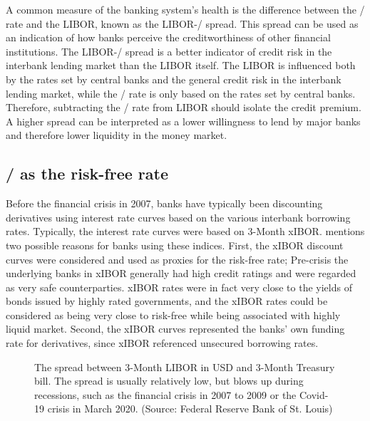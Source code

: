 \documentclass[main.tex]{subfiles}
\begin{document}
    A common measure of the banking system's health is the difference between the \OIS/ rate
    and the LIBOR, known as the LIBOR-\OIS/ spread.
    This spread can be used as an indication of how banks perceive the creditworthiness
    of other financial institutions. 
    The LIBOR-\OIS/ spread is a better indicator of credit risk in the interbank lending market
    than the LIBOR itself. 
    The LIBOR is influenced both by the rates set by central banks and 
    the general credit risk in the interbank lending market,
    while the \OIS/ rate is only based on the rates set by central banks.
    Therefore, subtracting the \OIS/ rate from LIBOR should isolate the credit premium.
    A higher spread can be interpreted as a lower willingness to lend by major banks
    and therefore lower liquidity in the money market.

    \subsection{\OIS/ as the risk-free rate}
    
    Before the financial crisis in 2007, banks have typically been discounting
    derivatives using interest rate curves based on the various interbank borrowing rates.
    Typically, the interest rate curves were based on 3-Month xIBOR.
    \textcite[Section 8.6]{Green2015XVA} 
    mentions two possible reasons for banks using these indices.
    First, the xIBOR discount curves were considered and used as proxies for the risk-free rate;
    Pre-crisis the underlying banks in xIBOR generally had high credit ratings
    and were regarded as very safe counterparties.
    xIBOR rates were in fact very close to the yields of bonds issued by highly rated governments,
    and the xIBOR rates could be considered as being very close to risk-free 
    while being associated with highly liquid market.
    Second, the xIBOR curves represented the banks' own funding rate for derivatives, since
    xIBOR referenced unsecured borrowing rates.

    \begin{figure}
        \centering
        \resizebox{\textwidth}{!}{%
            
        }
        \caption{
            The spread between 3-Month LIBOR in USD and 3-Month Treasury bill.
            The spread is usually relatively low, 
            but blows up during recessions, 
            such as the financial crisis in 2007 to 2009 or
            the Covid-19 crisis in March 2020.
            (Source: Federal Reserve Bank of St. Louis)
        }
        \label{fig:ted-spread}
    \end{figure}
\end{document}
